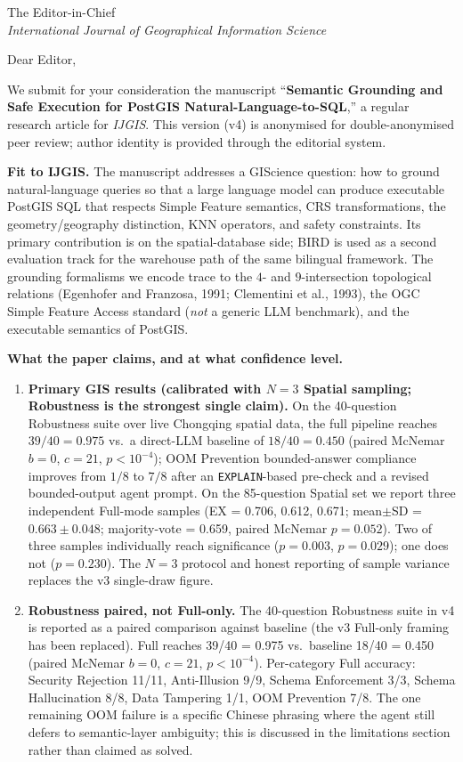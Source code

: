 \documentclass[11pt]{letter}
\begin{document}
\begin{letter}{The Editor-in-Chief \\ \emph{International Journal of Geographical Information Science}}

\opening{Dear Editor,}

We submit for your consideration the manuscript ``\textbf{Semantic Grounding and Safe Execution for PostGIS Natural-Language-to-SQL},'' a regular research article for \emph{IJGIS}. This version (v4) is anonymised for double-anonymised peer review; author identity is provided through the editorial system.

\medskip
\noindent\textbf{Fit to IJGIS.} The manuscript addresses a GIScience question: how to ground natural-language queries so that a large language model can produce executable PostGIS SQL that respects Simple Feature semantics, CRS transformations, the geometry/geography distinction, KNN operators, and safety constraints. Its primary contribution is on the spatial-database side; BIRD is used as a second evaluation track for the warehouse path of the same bilingual framework. The grounding formalisms we encode trace to the $4$- and $9$-intersection topological relations (Egenhofer and Franzosa, 1991; Clementini et al., 1993), the OGC Simple Feature Access standard (\emph{not} a generic LLM benchmark), and the executable semantics of PostGIS.

\medskip
\noindent\textbf{What the paper claims, and at what confidence level.}

\begin{enumerate}
\item \textbf{Primary GIS results (calibrated with $N=3$ Spatial sampling; Robustness is the strongest single claim).} On the 40-question Robustness suite over live Chongqing spatial data, the full pipeline reaches $39/40 = 0.975$ vs.\ a direct-LLM baseline of $18/40 = 0.450$ (paired McNemar $b=0$, $c=21$, $p<10^{-4}$); OOM Prevention bounded-answer compliance improves from $1/8$ to $7/8$ after an \texttt{EXPLAIN}-based pre-check and a revised bounded-output agent prompt. On the 85-question Spatial set we report three independent Full-mode samples (EX = 0.706, 0.612, 0.671; mean$\pm$SD = $0.663\pm 0.048$; majority-vote = 0.659, paired McNemar $p=0.052$). Two of three samples individually reach significance ($p=0.003$, $p=0.029$); one does not ($p=0.230$). The $N=3$ protocol and honest reporting of sample variance replaces the v3 single-draw figure.

\item \textbf{Robustness paired, not Full-only.} The 40-question Robustness suite in v4 is reported as a paired comparison against baseline (the v3 Full-only framing has been replaced). Full reaches 39/40 = 0.975 vs.\ baseline 18/40 = 0.450 (paired McNemar $b=0$, $c=21$, $p<10^{-4}$). Per-category Full accuracy: Security Rejection 11/11, Anti-Illusion 9/9, Schema Enforcement 3/3, Schema Hallucination 8/8, Data Tampering 1/1, OOM Prevention 7/8. The one remaining OOM failure is a specific Chinese phrasing where the agent still defers to semantic-layer ambiguity; this is discussed in the limitations section rather than claimed as solved.


\end{enumerate}
\end{letter}
\end{document}
